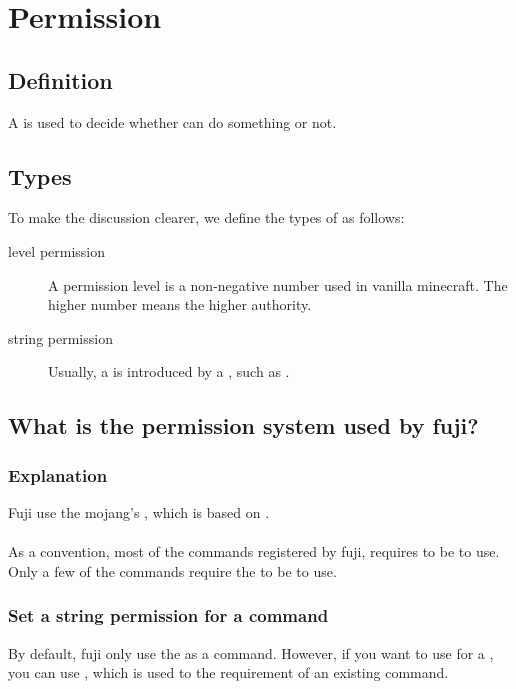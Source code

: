\chapter{Permission}\label{ch:permission}
\section{Definition}
A  is used to decide whether  can do something or not.


\section{Types}
To make the discussion clearer, we define the types of  as follows:
\begin{description}
    \item [level permission] A permission level is a non-negative number used in vanilla minecraft.
    The higher number means the higher authority.
    \item[string permission] Usually, a  is introduced by a , such as .
\end{description}

\clearpage


\section{What is the permission system used by fuji?}

\subsection{Explanation}
Fuji use the mojang's , which is based on .
\\
\\
As a convention, most of the commands registered by fuji, requires  to be  to use.
Only a few of the commands require the  to be  to use.

\subsection{Set a string permission for a command}
By default, fuji only use the  as  a command.
However, if you want to use  for a , you can use , which is used to  the requirement of an existing command.

